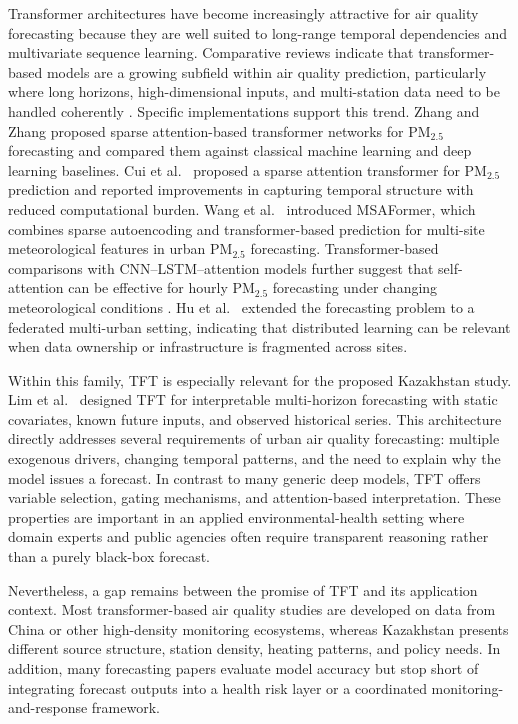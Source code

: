 \documentclass[pdflatex,sn-mathphys-num]{sn-jnl}
\begin{document}
Transformer architectures have become increasingly attractive for air quality forecasting because they are well suited to long-range temporal dependencies and multivariate sequence learning. Comparative reviews indicate that transformer-based models are a growing subfield within air quality prediction, particularly where long horizons, high-dimensional inputs, and multi-station data need to be handled coherently \cite{mendez2023survey}. Specific implementations support this trend. Zhang and Zhang \cite{zhang2023stn} proposed sparse attention-based transformer networks for PM$_{2.5}$ forecasting and compared them against classical machine learning and deep learning baselines. Cui et al.\ \cite{cui2023sparse} proposed a sparse attention transformer for PM$_{2.5}$ prediction and reported improvements in capturing temporal structure with reduced computational burden. Wang et al.\ \cite{wang2023msaformer} introduced MSAFormer, which combines sparse autoencoding and transformer-based prediction for multi-site meteorological features in urban PM$_{2.5}$ forecasting. Transformer-based comparisons with CNN--LSTM--attention models further suggest that self-attention can be effective for hourly PM$_{2.5}$ forecasting under changing meteorological conditions \cite{apr2023transformer}. Hu et al.\ \cite{hu2024feddeep} extended the forecasting problem to a federated multi-urban setting, indicating that distributed learning can be relevant when data ownership or infrastructure is fragmented across sites.

Within this family, TFT is especially relevant for the proposed Kazakhstan study. Lim et al.\ \cite{lim2021tft} designed TFT for interpretable multi-horizon forecasting with static covariates, known future inputs, and observed historical series. This architecture directly addresses several requirements of urban air quality forecasting: multiple exogenous drivers, changing temporal patterns, and the need to explain why the model issues a forecast. In contrast to many generic deep models, TFT offers variable selection, gating mechanisms, and attention-based interpretation. These properties are important in an applied environmental-health setting where domain experts and public agencies often require transparent reasoning rather than a purely black-box forecast.

Nevertheless, a gap remains between the promise of TFT and its application context. Most transformer-based air quality studies are developed on data from China or other high-density monitoring ecosystems, whereas Kazakhstan presents different source structure, station density, heating patterns, and policy needs. In addition, many forecasting papers evaluate model accuracy but stop short of integrating forecast outputs into a health risk layer or a coordinated monitoring-and-response framework.
\end{document}
